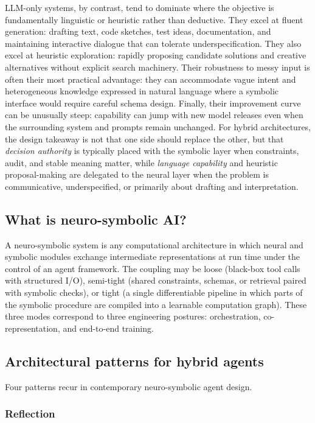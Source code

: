 LLM-only systems, by contrast, tend to dominate where the objective is fundamentally linguistic or heuristic rather than deductive. They excel at fluent generation: drafting text, code sketches, test ideas, documentation, and maintaining interactive dialogue that can tolerate underspecification. They also excel at heuristic exploration: rapidly proposing candidate solutions and creative alternatives without explicit search machinery. Their robustness to messy input is often their most practical advantage: they can accommodate vague intent and heterogeneous knowledge expressed in natural language where a symbolic interface would require careful schema design. Finally, their improvement curve can be unusually steep: capability can jump with new model releases even when the surrounding system and prompts remain unchanged. For hybrid architectures, the design takeaway is not that one side should replace the other, but that \emph{decision authority} is typically placed with the symbolic layer when constraints, audit, and stable meaning matter, while \emph{language capability} and heuristic proposal-making are delegated to the neural layer when the problem is communicative, underspecified, or primarily about drafting and interpretation.


\subsection{What is neuro-symbolic AI?}
\label{sec:what-is-neuro-symbolic}

A neuro-symbolic system is any computational architecture in which neural and symbolic modules exchange intermediate representations at run time under the control of an agent framework. The coupling may be loose (black-box tool calls with structured I/O), semi-tight (shared constraints, schemas, or retrieval paired with symbolic checks), or tight (a single differentiable pipeline in which parts of the symbolic procedure are compiled into a learnable computation graph). These three modes correspond to three engineering postures: orchestration, co-representation, and end-to-end training.

\subsection{Architectural patterns for hybrid agents}
\label{sec:patterns-hybrid-agents}

Four patterns recur in contemporary neuro-symbolic agent design.

\subsubsection{Reflection}

